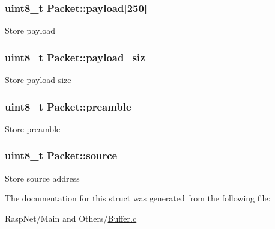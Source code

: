 \subsubsection[{\texorpdfstring{payload}{payload}}]{\setlength{\rightskip}{0pt plus 5cm}uint8\+\_\+t Packet\+::payload\mbox{[}250\mbox{]}}\hypertarget{structPacket_a58a48ac639979f488f254bbcb98e72b8}{}\label{structPacket_a58a48ac639979f488f254bbcb98e72b8}
Store payload 
\subsubsection[{\texorpdfstring{payload\+\_\+siz}{payload_siz}}]{\setlength{\rightskip}{0pt plus 5cm}uint8\+\_\+t Packet\+::payload\+\_\+siz}\hypertarget{structPacket_ab13014675ea9eda122b1c50842a567fc}{}\label{structPacket_ab13014675ea9eda122b1c50842a567fc}
Store payload size 
\subsubsection[{\texorpdfstring{preamble}{preamble}}]{\setlength{\rightskip}{0pt plus 5cm}uint8\+\_\+t Packet\+::preamble}\hypertarget{structPacket_aa305c88136c91911a5159610863cb41d}{}\label{structPacket_aa305c88136c91911a5159610863cb41d}
Store preamble 
\subsubsection[{\texorpdfstring{source}{source}}]{\setlength{\rightskip}{0pt plus 5cm}uint8\+\_\+t Packet\+::source}\hypertarget{structPacket_a01308f5b690e5060fea6037e765058b9}{}\label{structPacket_a01308f5b690e5060fea6037e765058b9}
Store source address 

The documentation for this struct was generated from the following file\+:\begin{DoxyCompactItemize}
\item 
Rasp\+Net/\+Main and Others/\hyperlink{Buffer_8c}{Buffer.\+c}\end{DoxyCompactItemize}
